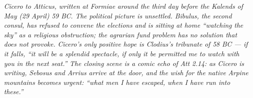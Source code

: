 
\textit{Cicero to Atticus, written at Formiae around the
third day before the Kalends of May (29 April) 59 BC. The
political picture is unsettled. Bibulus, the second
consul, has refused to convene the elections and is
sitting at home ``watching the sky'' as a religious
obstruction; the agrarian fund problem has no solution
that does not provoke. Cicero's only positive hope is
Clodius's tribunate of 58 BC --- if it falls, ``it will be
a splendid spectacle, if only it be permitted me to watch
with you in the next seat.'' The closing scene is a comic
echo of Att 2.14: as Cicero is writing, Sebosus and Arrius
arrive at the door, and the wish for the native Arpine
mountains becomes urgent: ``what men I have escaped, when
I have run into these.''}
